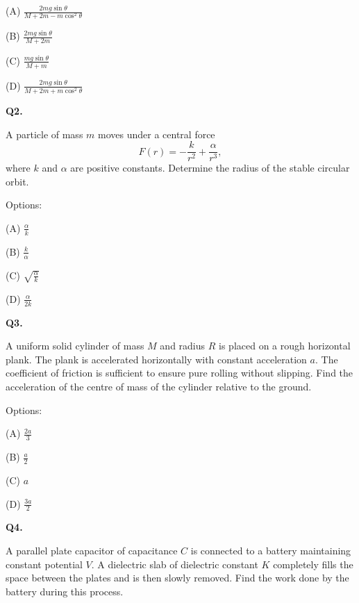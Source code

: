 \documentclass[12pt]{article}
\begin{document}
(A) $\displaystyle \frac{2mg\sin\theta}{M+2m-m\cos^2\theta}$

(B) $\displaystyle \frac{2mg\sin\theta}{M+2m}$

(C) $\displaystyle \frac{mg\sin\theta}{M+m}$

(D) $\displaystyle \frac{2mg\sin\theta}{M+2m+m\cos^2\theta}$

\vspace{0.7cm}

\textbf{Q2.}

A particle of mass $m$ moves under a central force 
\[
F(r) = -\frac{k}{r^2} + \frac{\alpha}{r^3},
\]
where $k$ and $\alpha$ are positive constants. 
Determine the radius of the stable circular orbit.

Options:

(A) $\displaystyle \frac{\alpha}{k}$

(B) $\displaystyle \frac{k}{\alpha}$

(C) $\displaystyle \sqrt{\frac{\alpha}{k}}$

(D) $\displaystyle \frac{\alpha}{2k}$

\vspace{0.7cm}

\textbf{Q3.}

A uniform solid cylinder of mass $M$ and radius $R$ is placed on a rough horizontal plank. 
The plank is accelerated horizontally with constant acceleration $a$. 
The coefficient of friction is sufficient to ensure pure rolling without slipping. 
Find the acceleration of the centre of mass of the cylinder relative to the ground.

Options:

(A) $\frac{2a}{3}$

(B) $\frac{a}{2}$

(C) $a$

(D) $\frac{3a}{2}$

\vspace{0.7cm}

\textbf{Q4.}

A parallel plate capacitor of capacitance $C$ is connected to a battery 
maintaining constant potential $V$. 
A dielectric slab of dielectric constant $K$ completely fills the space 
between the plates and is then slowly removed. 
Find the work done by the battery during this process.
\end{document}
